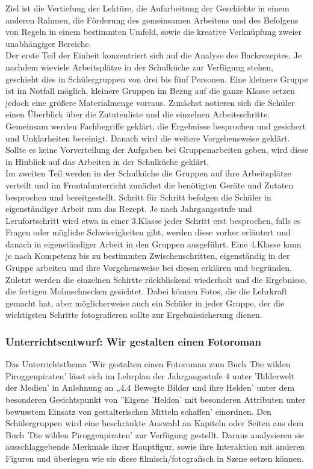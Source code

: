 Ziel ist die Vertiefung der Lektüre, die Aufarbeitung der Geschichte in einem anderen Rahmen, die Förderung des gemeinsamen Arbeitens und des Befolgens von Regeln in einem bestimmten Umfeld, sowie die kreative Verknüpfung zweier unabhängiger Bereiche.
\\
Der erste Teil der Einheit konzentriert sich auf die Analyse des Backrezeptes. Je nachdem wieviele Arbeitsplätze in der Schulküche zur Verfügung stehen, geschieht dies in Schülergruppen von drei bis fünf Personen. Eine kleinere Gruppe ist im Notfall möglich, kleinere Gruppen im Bezug auf die ganze Klasse setzen jedoch eine größere Materialmenge vorraus. Zunächst notieren sich die Schüler einen Überblick über die Zutatenliste und die einzelnen Arbeitsschritte. Gemeinsam werden Fachbegriffe geklärt, die Ergebnisse besprochen und gesichert und Unklarheiten bereinigt. Danach wird die weitere Vorgehensweise geklärt. Sollte es keine Vorverteilung der Aufgaben bei Gruppenarbeiten geben, wird diese in Hinblick auf das Arbeiten in der Schulküche geklärt.
\\
Im zweiten Teil werden in der Schulküche die Gruppen auf ihre Arbeitsplätze verteilt und im Frontalunterricht zunächst die benötigten Geräte und Zutaten besprochen und bereitgestellt. Schritt für Schritt befolgen die Schüler in eigenständiger Arbeit nun das Rezept. Je nach Jahrgangsstufe und Lernfortschritt wird etwa in einer 3.Klasse  jeder Schritt erst besprochen, falls es Fragen oder mögliche Schwierigkeiten gibt, werden diese vorher erläutert und danach in eigenständiger Arbeit in den Gruppen ausgeführt. Eine 4.Klasse kann je nach Kompetenz bis zu bestimmten Zwischenschritten, eigenständig in der Gruppe arbeiten und ihre Vorgehensweise bei diesen erklären und begründen.
\\
Zuletzt werden die einzelnen Schirtte rückblickend wiederholt und die Ergebnisse, die fertigen Mohnschnecken gesichtet. Dabei können Fotos, die die Lehrkraft gemacht hat, aber möglicherweise auch ein Schüler in jeder Gruppe, der die wichtigsten Schritte fotografieren sollte zur Ergebnissicherung dienen.

\subsubsection{Unterrichtsentwurf: Wir gestalten einen Fotoroman}

Das Unterrichtsthema 'Wir gestalten einen Fotoroman zum Buch 'Die wilden Piroggenpiraten' lässt sich im Lehrplan der Jahrgangsstufe 4 unter 'Bilderwelt der Medien' in Anlehnung an „4.4 Bewegte Bilder und ihre Helden' \cite[S.279]{LP} unter dem besonderen Gesichtspunkt von ''Eigene 'Helden' mit besonderen Attributen unter bewusstem Einsatz von gestalterischen Mitteln schaffen' einordnen. Den Schülergruppen wird eine beschränkte Auswahl an Kapiteln oder Seiten aus dem Buch 'Die wilden Piroggenpiraten' zur Verfügung gestellt. Daraus analysieren sie ausschlaggebende Merkmale ihrer Hauptfigur, sowie ihre Interaktion mit anderen Figuren und überlegen wie sie diese filmisch/fotografisch in Szene setzen können. 

